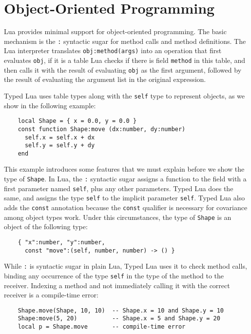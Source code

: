 \section{Object-Oriented Programming}
\label{sec:oop}

Lua provides minimal support for object-oriented programming.
The basic mechanism is the \texttt{:} syntactic sugar for method
calls and method definitions.
The Lua interpreter translates \texttt{obj:method(args)} into
an operation that first evaluates \texttt{obj}, if it is a table
Lua checks if there is field \texttt{method} in this table,
and then calls it with the result of evaluating \texttt{obj} as
the first argument, followed by the result of evaluating the
argument list in the original expression.

Typed Lua uses table types along with the \texttt{self} type to
represent objects, as we show in the following example:
\begin{verbatim}
    local Shape = { x = 0.0, y = 0.0 }
    const function Shape:move (dx:number, dy:number)
      self.x = self.x + dx
      self.y = self.y + dy
    end
\end{verbatim}

This example introduces some features that we must explain
before we show the type of \texttt{Shape}.
In Lua, the \texttt{:} syntactic sugar assigns a function to the
field with a first parameter named \texttt{self}, plus any other
parameters.
Typed Lua does the same, and assigns the type \texttt{self} to the
implicit parameter \texttt{self}.
Typed Lua also adds the \texttt{const} annotation because the
\texttt{const} qualifier is necessary for covariance among object types work.
Under this circumstances, the type of \texttt{Shape} is an object of
the following type:
\begin{verbatim}
    { "x":number, "y":number,
      const "move":(self, number, number) -> () }
\end{verbatim}

While \texttt{:} is syntactic sugar in plain Lua, Typed Lua uses it
to check method calls, binding any occurrence of the type \texttt{self}
in the type of the method to the receiver.
Indexing a method and not immediately calling it with the correct
receiver is a compile-time error:
\begin{verbatim}
    Shape.move(Shape, 10, 10)  -- Shape.x = 10 and Shape.y = 10
    Shape:move(5, 20)          -- Shape.x = 5 and Shape.y = 20
    local p = Shape.move       -- compile-time error
\end{verbatim}

